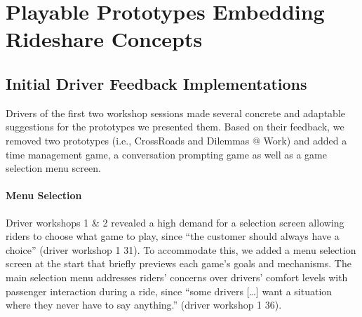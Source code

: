 

\section{Playable Prototypes Embedding Rideshare Concepts} \label{prototypes}
\setcounter{subsection}{-1}
\subsection{Initial Driver Feedback Implementations} 
Drivers of the first two workshop sessions made several concrete and adaptable suggestions for the prototypes we presented them. Based on their feedback, we removed two prototypes (i.e., CrossRoads and Dilemmas @ Work) and added a time management game, a conversation prompting game as well as a game selection menu screen.


\paragraph{Menu Selection} 

Driver workshops 1 \& 2 
revealed a high demand for a selection screen allowing riders to choose what game to play, since ``the customer should always have a choice'' (driver workshop 1 31).  
To accommodate this, we added a menu selection screen at the start that briefly previews each game's goals and mechanisms. 
The main selection menu addresses riders' concerns over drivers' comfort levels with passenger interaction during a ride, since ``some drivers [\dots] want a situation where they never have to say anything.'' (driver workshop 1 36).


